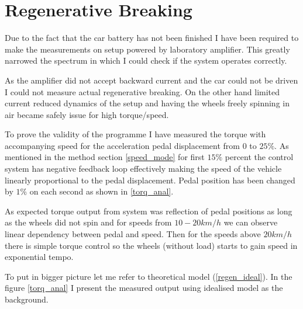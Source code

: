 \section{Regenerative Breaking}
Due to the fact that the car battery has not been finished I have been required to make the measurements on setup powered by laboratory amplifier. This greatly narrowed the spectrum in which I could check if the system operates correctly.

As the amplifier did not accept backward current and the car could not be driven I could not measure actual regenerative breaking. On the other hand limited current reduced dynamics of the setup and having the wheels freely spinning in air became safely issue for high torque/speed.

To prove the validity of the programme I have measured the torque with accompanying speed for the acceleration pedal displacement from $0$ to $25\%$. As mentioned in the method section \ref{speed_mode} for first $15\%$ percent the control system has negative feedback loop effectively making the speed of the vehicle linearly proportional to the pedal displacement.
Pedal position has been changed by $1\%$ on each second as shown in \ref{torq_anal}. 


As expected torque output from system was reflection of pedal positions as long as the wheels did not spin and for speeds from $10-20 km/h$ we can observe linear dependency between pedal and speed. Then for the speeds above $20km/h$ there is simple torque control so the wheels (without load) starts to gain speed in exponential tempo.

To put in bigger picture let me refer to theoretical model (\ref{regen_ideal}). In the figure \ref{torq_anal} I present the measured output using idealised model as the background. 


